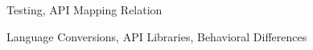 \documentclass[10pt,preprint]{sigplanconf}
\begin{document}
\terms
Testing, API Mapping Relation

\keywords
Language Conversions, API Libraries, Behavioral Differences

%
%


%


%
%

\end{document}
